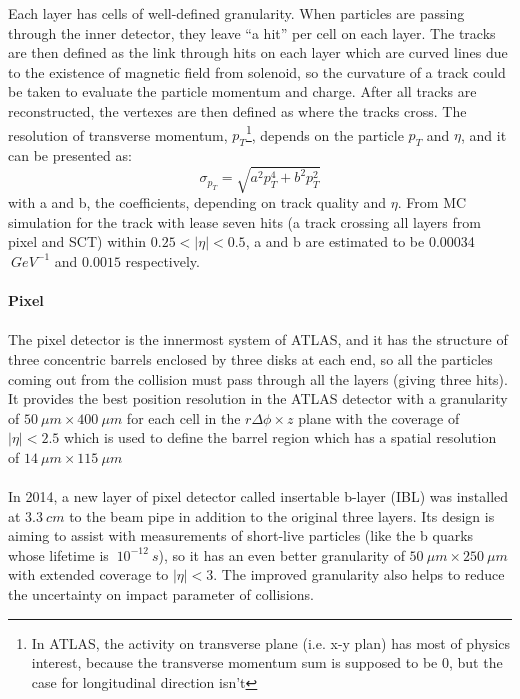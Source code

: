 Each layer has cells of well-defined granularity. When particles are passing through the inner detector, they leave ``a hit'' per cell on each layer. The tracks are then defined as the link through hits on each layer which are curved lines due to the existence of magnetic field from solenoid, so the curvature of a track could be taken to evaluate the particle momentum and charge. After all tracks are reconstructed, the vertexes are then defined as where the tracks cross. The resolution of transverse momentum, $p_{T}$\footnote{In ATLAS, the activity on transverse plane (i.e. x-y plan) has most of physics interest, because the transverse momentum sum is supposed to be 0, but the case for longitudinal direction isn't}, depends on the particle $p_{T}$ and $\eta$, and it can be presented as:
\begin{equation}
\sigma_{p_{T}} = \sqrt{a^{2}p_{T}^{4}+b^{2}p_{T}^{2}}
\end{equation}
with a and b, the coefficients, depending on track quality and $\eta$. From MC simulation for the track with lease seven hits (a track crossing all layers from pixel and SCT) within $0.25<|\eta|<0.5$, a and b are estimated to be 0.00034 $~GeV^{-1}$ and $0.0015$ respectively.
\\
\\{\bf Pixel\cite{Collaboration:2285585}}
\\
\\The pixel detector is the innermost system of ATLAS, and it has the structure of three concentric barrels enclosed by three disks at each end, so all the particles coming out from the collision must pass through all the layers (giving three hits). It provides the best position resolution in the ATLAS detector with a granularity of $50~\mu m\times 400~\mu m$  for each cell in the $r\Delta \phi \times z$ plane with the coverage of $|\eta|<2.5$ which is used to define the barrel region which has a spatial resolution of $14~\mu m\times 115~\mu m$
\\
\\In 2014, a new layer of pixel detector called insertable b-layer (IBL) \cite{Miucci_2014} was installed at $3.3~cm$ to the beam pipe in addition to the original three layers. Its design is aiming to assist with measurements of short-live particles (like the b quarks whose lifetime is $~10^{-12}~s$), so it has an even better granularity of $50~\mu m\times 250~\mu m$ with extended coverage to $|\eta|<3$. The improved granularity also helps to reduce the uncertainty on impact parameter of collisions.
\\
